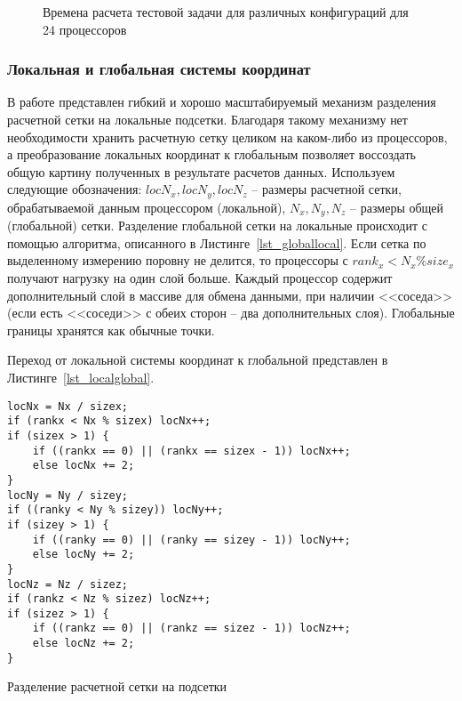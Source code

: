 \begin{figure}
\begin{center}
\caption{Времена расчета тестовой задачи для различных конфигураций для 24 процессоров}
\label{diagr_div}
\end{center}
\end{figure}

\subsubsection*{Локальная и глобальная системы координат}
В работе представлен гибкий и хорошо масштабируемый механизм разделения
расчетной сетки на локальные подсетки. Благодаря такому механизму
нет необходимости хранить расчетную сетку целиком на каком-либо из
процессоров, а преобразование локальных координат к глобальным
позволяет воссоздать общую картину полученных в результате расчетов
данных.
Используем следующие обозначения:
$locN_x, locN_y, locN_z$ -- размеры расчетной сетки, обрабатываемой
данным процессором (локальной), $N_x, N_y, N_z$ -- размеры общей (глобальной) сетки.
Разделение глобальной сетки на локальные происходит с помощью
алгоритма, описанного в Листинге~\ref{lst_globallocal}. 
Если сетка по выделенному измерению поровну не делится, то процессоры с $rank_x < N_x \% size_x$ получают нагрузку
на один слой больше. Каждый процессор содержит дополнительный слой в массиве для обмена данными, при 
наличии <<соседа>> (если есть <<соседи>> с обеих сторон -- два дополнительных слоя).
Глобальные границы хранятся как обычные точки.

Переход от локальной
системы координат к глобальной представлен в Листинге~\ref{lst_localglobal}.

\begin{listing}
\begin{verbatim}
locNx = Nx / sizex;
if (rankx < Nx % sizex) locNx++;
if (sizex > 1) {
    if ((rankx == 0) || (rankx == sizex - 1)) locNx++;
    else locNx += 2;
}
locNy = Ny / sizey;
if ((ranky < Ny % sizey)) locNy++;
if (sizey > 1) {
    if ((ranky == 0) || (ranky == sizey - 1)) locNy++;
    else locNy += 2;
}
locNz = Nz / sizez;
if (rankz < Nz % sizez) locNz++;
if (sizez > 1) {
    if ((rankz == 0) || (rankz == sizez - 1)) locNz++;
    else locNz += 2;
}
\end{verbatim}
\caption{Разделение расчетной сетки на подсетки}
\label{lst_globallocal}
\end{listing}

